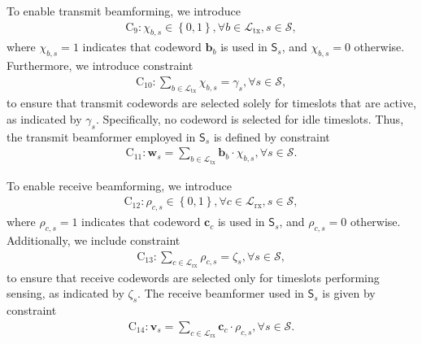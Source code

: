 \documentclass[10pt,journal,compsoc]{IEEEtran}
\theoremstyle{myremark}
\theoremstyle{myexample}
\begin{document}
 
To enable transmit beamforming, we introduce 
\begin{align*}  
	\mathrm{C}_{9}: \chi_{b,s} \in \left\lbrace 0, 1 \right\rbrace, \forall b \in \mathcal{L}_\mathrm{tx}, s \in \mathcal{S}, 
\end{align*}
where $ \chi_{b,s} = 1 $ indicates that codeword $ \mathbf{b}_b $ is used in $ \mathsf{S}_s $, and $ \chi_{b,s} = 0 $ otherwise. Furthermore, we introduce constraint
\begin{align*}  
	\textstyle
	\mathrm{C}_{10}: \sum_{b \in \mathcal{L}_\mathrm{tx}} \chi_{b,s} = \gamma_s, \forall s \in \mathcal{S}, 
\end{align*}
to ensure that transmit codewords are selected solely for timeslots that are active, as indicated by $ \gamma_s $. Specifically, no codeword is selected for idle timeslots. Thus, the transmit beamformer employed in $ \mathsf{S}_s $ is defined by constraint
\begin{align*}  
	\textstyle
	\mathrm{C}_{11}: \mathbf{w}_s = \sum_{b \in \mathcal{L}_\mathrm{tx}} \mathbf{b}_b \cdot \chi_{b,s}, \forall s \in \mathcal{S}.
\end{align*}


 
To enable receive beamforming, we introduce 
\begin{align*}  
	\mathrm{C}_{12}: \rho_{c,s} \in \left\lbrace 0, 1 \right\rbrace, \forall c \in \mathcal{L}_\mathrm{rx}, s \in \mathcal{S}, 
\end{align*}
where $ \rho_{c,s} = 1 $ indicates that codeword $ \mathbf{c}_c $ is used in $ \mathsf{S}_s $, and  $ \rho_{c,s} = 0 $ otherwise. Additionally, we include constraint
\begin{align*}  
	\textstyle
	\mathrm{C}_{13}: \sum_{c \in \mathcal{L}_\mathrm{rx}} \rho_{c,s} = \zeta_s, \forall s \in \mathcal{S}, 
\end{align*}
to ensure that receive codewords are selected only for timeslots performing sensing, as indicated by $ \zeta_s $. The receive beamformer used in $ \mathsf{S}_s $ is given by constraint
\begin{align*} 
	\textstyle 
	\mathrm{C}_{14}: \mathbf{v}_s = \sum_{c \in \mathcal{L}_\mathrm{rx}} \mathbf{c}_c \cdot \rho_{c,s}, \forall s \in \mathcal{S}. 
\end{align*}
\end{document}

